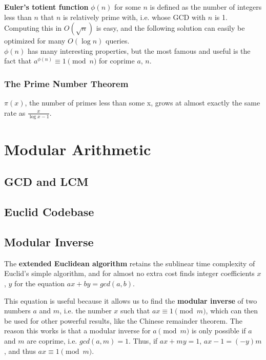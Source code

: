 \documentclass[../main]{subfiles}
\begin{document}
    \textbf{Euler's totient function} $\phi(n)$ for some $n$ is defined as the number of integers less than $n$ that $n$ is relatively prime with, i.e. whose GCD with $n$ is 1. Computing this in $O(\sqrt{n})$ is easy, and the following solution can easily be optimized for many $O(\log n)$ queries.\\

    $\phi(n)$ has many interesting properties, but the most famous and useful is the fact that $a^{\phi(n)} \equiv 1 \pmod{n}$ for coprime $a$, $n$.

    \subsubsection*{The Prime Number Theorem}
    
        $\pi(x)$, the number of primes less than some x, grows 
        at almost exactly the same rate as $\frac{x}{\log{x}-1}$.

\section{Modular Arithmetic}

    \subsection{GCD and LCM}


    \subsection{Euclid Codebase}


    \subsection{Modular Inverse}

    The \textbf{extended Euclidean algorithm} retains the sublinear time complexity of Euclid's simple algorithm, and for almost no extra cost finds integer coefficients $x$, $y$ for the equation $ax + by = gcd(a, b)$.
    

    This equation is useful because it allows us to find the \textbf{modular inverse} of two numbers $a$ and $m$, i.e. the number $x$ such that $ax \equiv 1 \pmod{m}$, which can then be used for other powerful results, like the Chinese remainder theorem. The reason this works is that a modular inverse for $a \pmod{m}$ is only possible if $a$ and $m$ are coprime, i.e. $gcd(a, m) = 1$. Thus, if $ax + my = 1$, $ax - 1 = (-y)m$, and thus $ax \equiv 1 \pmod{m}$.
\end{document}
